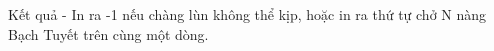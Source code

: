 Kết quả
- In ra -1 nếu chàng lùn không thể kịp, hoặc in ra thứ tự chở N nàng Bạch Tuyết trên cùng một dòng.